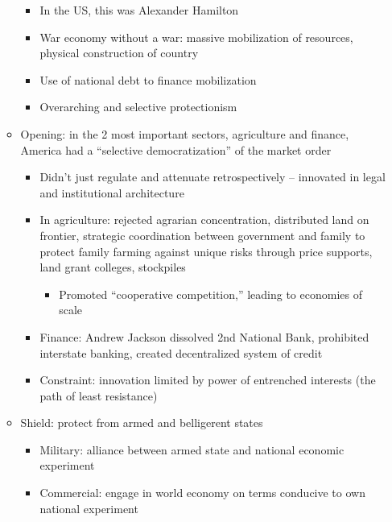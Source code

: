 \begin{itemize}
\begin{itemize}
    \begin{itemize}
    \tightlist
    \item
      In the US, this was Alexander Hamilton
    \item
      War economy without a war: massive mobilization of resources,
      physical construction of country
    \item
      Use of national debt to finance mobilization
    \item
      Overarching and selective protectionism
    \end{itemize}
  \item
    Opening: in the 2 most important sectors, agriculture and finance,
    America had a ``selective democratization'' of the market order

    \begin{itemize}
    \tightlist
    \item
      Didn't just regulate and attenuate retrospectively -- innovated in
      legal and institutional architecture
    \item
      In agriculture: rejected agrarian concentration, distributed land
      on frontier, strategic coordination between government and family
      to protect family farming against unique risks through price
      supports, land grant colleges, stockpiles

      \begin{itemize}
      \tightlist
      \item
        Promoted ``cooperative competition,'' leading to economies of
        scale
      \end{itemize}
    \item
      Finance: Andrew Jackson dissolved 2nd National Bank, prohibited
      interstate banking, created decentralized system of credit
    \item
      Constraint: innovation limited by power of entrenched interests
      (the path of least resistance)
    \end{itemize}
  \item
    Shield: protect from armed and belligerent states

    \begin{itemize}
    \tightlist
    \item
      Military: alliance between armed state and national economic
      experiment
    \item
      Commercial: engage in world economy on terms conducive to own
      national experiment


\end{itemize}
\end{itemize}
\end{itemize}
